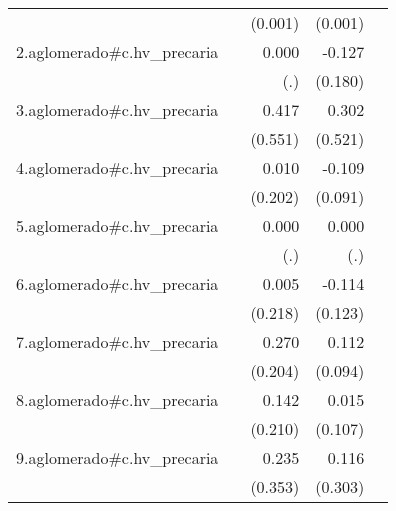 {\begin{longtable}{l*{4}{D{.}{.}{-1}}}
            &                     &     (0.001)         &     (0.001)         &                     \\
\addlinespace
2.aglomerado#c.hv\_precaria&                     &       0.000         &      -0.127         &                     \\
            &                     &         (.)         &     (0.180)         &                     \\
\addlinespace
3.aglomerado#c.hv\_precaria&                     &       0.417         &       0.302         &                     \\
            &                     &     (0.551)         &     (0.521)         &                     \\
\addlinespace
4.aglomerado#c.hv\_precaria&                     &       0.010         &      -0.109         &                     \\
            &                     &     (0.202)         &     (0.091)         &                     \\
\addlinespace
5.aglomerado#c.hv\_precaria&                     &       0.000         &       0.000         &                     \\
            &                     &         (.)         &         (.)         &                     \\
\addlinespace
6.aglomerado#c.hv\_precaria&                     &       0.005         &      -0.114         &                     \\
            &                     &     (0.218)         &     (0.123)         &                     \\
\addlinespace
7.aglomerado#c.hv\_precaria&                     &       0.270         &       0.112         &                     \\
            &                     &     (0.204)         &     (0.094)         &                     \\
\addlinespace
8.aglomerado#c.hv\_precaria&                     &       0.142         &       0.015         &                     \\
            &                     &     (0.210)         &     (0.107)         &                     \\
\addlinespace
9.aglomerado#c.hv\_precaria&                     &       0.235         &       0.116         &                     \\
            &                     &     (0.353)         &     (0.303)         &                     \\

\end{longtable}}

